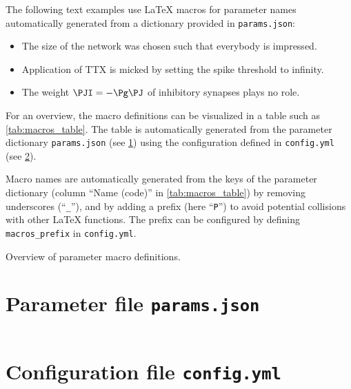 \documentclass[10pt,a4paper,american]{article}
\begin{document}
The following text examples use LaTeX macros for parameter names automatically generated from a dictionary provided in \texttt{params.json}:
\begin{itemize}
\item The size \PN of the network was chosen such that everybody is impressed.
\item Application of TTX is micked by setting the spike threshold \PVth to infinity.
\item The weight $\PJI=-\Pg\PJ$ of inhibitory synapses plays no role.
\end{itemize}
For an overview, the macro definitions can be visualized in a table such as \cref{tab:macros_table}.
The table is automatically generated from the parameter dictionary \texttt{params.json} (see \cref{app:parameter_file}) using the configuration defined in \texttt{config.yml} (see \cref{app:config_file}).
\par
Macro names are automatically generated from the keys of the parameter dictionary (column ``Name (code)'' in \cref{tab:macros_table}) by removing underscores (``\verb+_+''), and by adding a prefix (here ``\verb+P+'') to avoid potential collisions with other LaTeX functions. The prefix can be configured by defining \verb+macros_prefix+ in \texttt{config.yml}.
\begin{table}[ht!]
\begin{center}
  \parbox{0.8\linewidth}{       %
    \small%
    \centering%
    \renewcommand{\arraystretch}{1.5}%
    \noindent%
    \caption{Overview of parameter macro definitions.}
    \label{tab:macros_table}
  }
\end{center}
\end{table}

\clearpage

\begin{appendix}
  
  \section{Parameter file \texttt{params.json}}
  \label{app:parameter_file}
  {\footnotesize
    \inputminted{json}{params.json}  
  }
  
  \clearpage
  
  \section{Configuration file \texttt{config.yml}}
  \label{app:config_file}
  {\footnotesize
    \inputminted{yaml}{config.yml}  
  }
\end{appendix}

\end{document}
